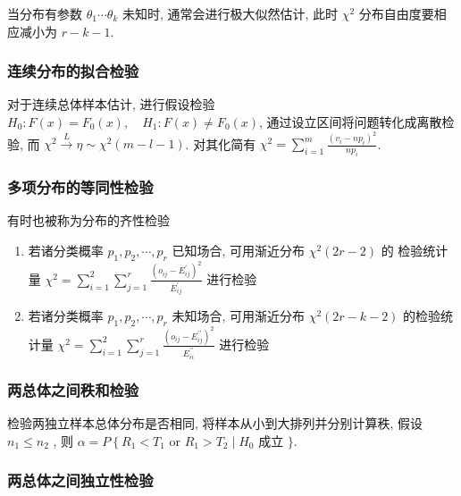 \documentclass[10pt]{yerbaformat}
\begin{document}
\par 当分布有参数 $\theta_{1} \cdots \theta_{k}$ 未知时, 通常会进行极大似然估计, 此时 $\chi^2$ 分布自由度要相应减小为 $r-k-1$.

\subsubsection{连续分布的拟合检验}

\par 对于连续总体样本估计, 进行假设检验 $H_{0}: F(x)=F_{0}(x), \quad H_{1}: F(x) \neq F_{0}(x)$, 通过设立区间将问题转化成离散检验, 而 $\chi^{2} \stackrel{L}{\rightarrow} \eta \sim \chi^{2}(m-l-1)$. 对其化简有 $\chi^{2}=\sum_{i=1}^{m} \frac{\left(v_{i}-n p_{i}\right)^{2}}{n p_{i}}$.

\subsubsection{多项分布的等同性检验}

\par 有时也被称为分布的齐性检验
\begin{enumerate}
    \item 若诸分类概率 $p_{1}, p_{2}, \cdots, p_{r}$ 已知场合, 可用渐近分布 $\chi^{2}(2 r-2)$ 的 检验统计量 $\chi^{2}=\sum_{i=1}^{2} \sum_{j=1}^{r} \frac{\left(o_{i j}-E_{i j}^{\prime}\right)^{2}}{E_{i j}^{\prime}}$ 进行检验
    \item 若诸分类概率 $p_{1}, p_{2}, \cdots, p_{r}$ 未知场合, 可用渐近分布 $\chi^{2}(2 r-k-2)$ 的检验统计量 $\chi^{2}=\sum_{i=1}^{2} \sum_{j=1}^{r} \frac{\left(o_{i j}-E_{i j}^{\prime \prime}\right)^{2}}{E_{i i}^{\prime \prime}}$ 进行检验
\end{enumerate}

\subsubsection{两总体之间秩和检验}

\par 检验两独立样本总体分布是否相同, 将样本从小到大排列并分别计算秩, 假设 $n_1 \leq n_2$ , 则 $\alpha=P\left\{R_{1}<T_{1}\right.$ or $R_{1}>T_{2} \mid H_{0}$ 成立 $\}$.

\subsubsection{两总体之间独立性检验}
\end{document}
